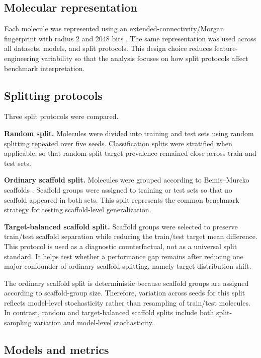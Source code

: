 \subsection{Molecular representation}

Each molecule was represented using an extended-connectivity/Morgan fingerprint with radius 2 and 2048 bits \citep{rogers2010extended}. The same representation was used across all datasets, models, and split protocols. This design choice reduces feature-engineering variability so that the analysis focuses on how split protocols affect benchmark interpretation.

\subsection{Splitting protocols}

Three split protocols were compared.

\textbf{Random split.} Molecules were divided into training and test sets using random splitting repeated over five seeds. Classification splits were stratified when applicable, so that random-split target prevalence remained close across train and test sets.

\textbf{Ordinary scaffold split.} Molecules were grouped according to Bemis--Murcko scaffolds \citep{bemis1996properties}. Scaffold groups were assigned to training or test sets so that no scaffold appeared in both sets. This split represents the common benchmark strategy for testing scaffold-level generalization.

\textbf{Target-balanced scaffold split.} Scaffold groups were selected to preserve train/test scaffold separation while reducing the train/test target mean difference. This protocol is used as a diagnostic counterfactual, not as a universal split standard. It helps test whether a performance gap remains after reducing one major confounder of ordinary scaffold splitting, namely target distribution shift.

The ordinary scaffold split is deterministic because scaffold groups are assigned according to scaffold-group size. Therefore, variation across seeds for this split reflects model-level stochasticity rather than resampling of train/test molecules. In contrast, random and target-balanced scaffold splits include both split-sampling variation and model-level stochasticity.

\subsection{Models and metrics}

